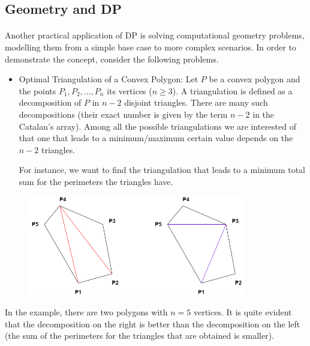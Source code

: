 \documentclass[letterpaper]{article}
\begin{document}
\newpage

\subsection{Geometry and DP}

\paragraph{}

Another practical application of DP is solving computational geometry problems, modelling them from a simple base case to more complex scenarios. In order to demonstrate the concept, consider the following problems.

\begin{itemize}
    \item Optimal Triangulation of a Convex Polygon: Let $P$ be a convex polygon and the points $P_{1}, P_{2}, \dots, P_{n}$ its vertices ($n \geq 3$). A triangulation is defined as a decomposition of $P$ in $n - 2$ disjoint triangles. There are many such decompositions (their exact number is given by the term $n - 2$ in the Catalan's array). Among all the possible triangulations we are interested of that one that leads to a minimum/maximum certain value depends on the $n - 2$ triangles. 

    For instance, we want to find the triangulation that leads to a minimum total sum for the perimeters the triangles have.
\end{itemize}

\begin{figure} [h!]
\centering
\includegraphics[width=0.85\textwidth]{pngOfDiagrams/geometrydp1.png}
\end{figure}

In the example, there are two polygons with $n = 5$ vertices. It is quite evident that the decomposition on the right is better than the decomposition on the left (the sum of the perimeters for the triangles that are obtained is smaller). 
\end{document}
